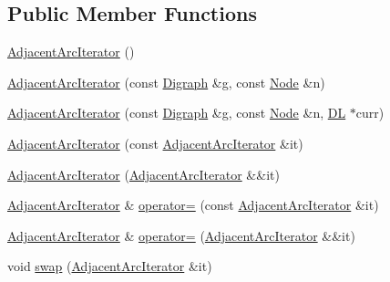 \subsection*{Public Member Functions}
\begin{DoxyCompactItemize}
\item 
\hyperlink{class_designar_1_1_digraph_1_1_adjacent_arc_iterator_a44c04d22e04c7458517a41bced9338f6}{Adjacent\+Arc\+Iterator} ()
\item 
\hyperlink{class_designar_1_1_digraph_1_1_adjacent_arc_iterator_a0e41952269f1ca89fd7647cb457cb6e2}{Adjacent\+Arc\+Iterator} (const \hyperlink{class_designar_1_1_digraph}{Digraph} \&g, const \hyperlink{class_designar_1_1_digraph_a4dc921c41a480b7946a04170e997d8ae}{Node} \&n)
\item 
\hyperlink{class_designar_1_1_digraph_1_1_adjacent_arc_iterator_ae4f0209339948fd0d1f6e6f26307ca9c}{Adjacent\+Arc\+Iterator} (const \hyperlink{class_designar_1_1_digraph}{Digraph} \&g, const \hyperlink{class_designar_1_1_digraph_a4dc921c41a480b7946a04170e997d8ae}{Node} \&n, \hyperlink{class_designar_1_1_d_l}{DL} $\ast$curr)
\item 
\hyperlink{class_designar_1_1_digraph_1_1_adjacent_arc_iterator_acf32a4ea55f99c576876e4c7d981ec70}{Adjacent\+Arc\+Iterator} (const \hyperlink{class_designar_1_1_digraph_1_1_adjacent_arc_iterator}{Adjacent\+Arc\+Iterator} \&it)
\item 
\hyperlink{class_designar_1_1_digraph_1_1_adjacent_arc_iterator_a43dfb1bed036cb0c417905526727883f}{Adjacent\+Arc\+Iterator} (\hyperlink{class_designar_1_1_digraph_1_1_adjacent_arc_iterator}{Adjacent\+Arc\+Iterator} \&\&it)
\item 
\hyperlink{class_designar_1_1_digraph_1_1_adjacent_arc_iterator}{Adjacent\+Arc\+Iterator} \& \hyperlink{class_designar_1_1_digraph_1_1_adjacent_arc_iterator_a2f354557278794bdd4bfc2c43c236814}{operator=} (const \hyperlink{class_designar_1_1_digraph_1_1_adjacent_arc_iterator}{Adjacent\+Arc\+Iterator} \&it)
\item 
\hyperlink{class_designar_1_1_digraph_1_1_adjacent_arc_iterator}{Adjacent\+Arc\+Iterator} \& \hyperlink{class_designar_1_1_digraph_1_1_adjacent_arc_iterator_a4dddbdfac352389f4fe7bf7f809c5655}{operator=} (\hyperlink{class_designar_1_1_digraph_1_1_adjacent_arc_iterator}{Adjacent\+Arc\+Iterator} \&\&it)
\item 
void \hyperlink{class_designar_1_1_digraph_1_1_adjacent_arc_iterator_a115f64297073bcdf6724045da1487d85}{swap} (\hyperlink{class_designar_1_1_digraph_1_1_adjacent_arc_iterator}{Adjacent\+Arc\+Iterator} \&it)

\end{DoxyCompactItemize}
